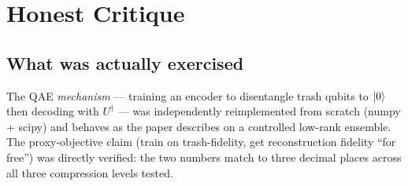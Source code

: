 \documentclass[11pt]{article}
\begin{document}
\section{Honest Critique}
\subsection*{What was actually exercised}
The QAE \emph{mechanism} --- training an encoder to disentangle trash qubits to
$\ket{0}$ then decoding with $U^\dagger$ --- was independently reimplemented
from scratch (numpy + scipy) and behaves as the paper describes on a controlled
low-rank ensemble. The proxy-objective claim (train on trash-fidelity, get
reconstruction fidelity ``for free'') was directly verified: the two numbers
match to three decimal places across all three compression levels tested.
\end{document}
